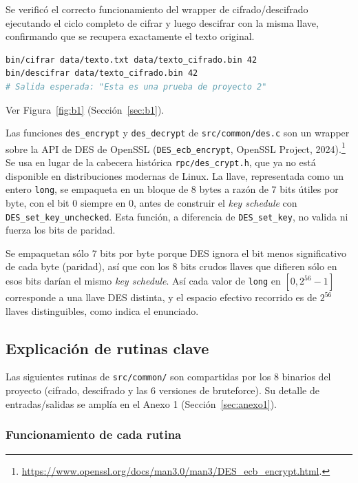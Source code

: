 \documentclass[11pt,letterpaper]{article}
\begin{document}
Se verificó el correcto funcionamiento del wrapper de cifrado/descifrado
ejecutando el ciclo completo de cifrar y luego descifrar con la misma
llave, confirmando que se recupera exactamente el texto original.

\begin{lstlisting}[language=bash]
bin/cifrar data/texto.txt data/texto_cifrado.bin 42
bin/descifrar data/texto_cifrado.bin 42
# Salida esperada: "Esta es una prueba de proyecto 2"
\end{lstlisting}

Ver Figura~\ref{fig:b1} (Sección~\ref{sec:b1}).

Las funciones \texttt{des\_encrypt} y \texttt{des\_decrypt} de
\texttt{src/common/des.c} son un wrapper sobre la API de DES de
OpenSSL (\texttt{DES\_ecb\_encrypt}, OpenSSL Project, 2024).\footnote{\url{https://www.openssl.org/docs/man3.0/man3/DES_ecb_encrypt.html}.} Se usa en
lugar de la cabecera histórica \texttt{rpc/des\_crypt.h}, que ya no
está disponible en distribuciones modernas de Linux. La llave,
representada como un entero \texttt{long}, se empaqueta en un bloque
de 8 bytes a razón de 7 bits útiles por byte, con el bit 0 siempre en
0, antes de construir el \textit{key schedule} con
\texttt{DES\_set\_key\_unchecked}. Esta función, a diferencia de
\texttt{DES\_set\_key}, no valida ni fuerza los bits de paridad.

Se empaquetan sólo 7 bits por byte porque DES ignora el bit menos
significativo de cada byte (paridad), así que con los 8 bits crudos llaves que
difieren sólo en esos bits darían el mismo \textit{key schedule}. Así
cada valor de \texttt{long} en $[0, 2^{56}-1]$ corresponde a una llave
DES distinta, y el espacio efectivo recorrido es de $2^{56}$ llaves
distinguibles, como indica el enunciado.

\subsection{Explicación de rutinas clave}

Las siguientes rutinas de \texttt{src/common/} son compartidas por los
8 binarios del proyecto (cifrado, descifrado y las 6 versiones de
bruteforce). Su detalle de entradas/salidas se amplía en el Anexo 1
(Sección~\ref{sec:anexo1}).


\subsubsection*{Funcionamiento de cada rutina}
\end{document}
